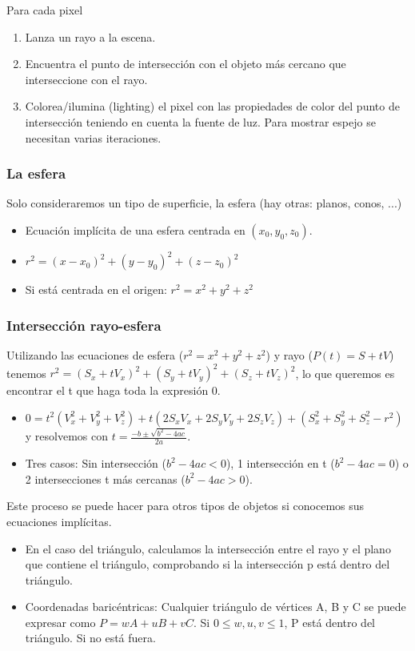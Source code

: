 Para cada pixel
\begin{enumerate}
	\item Lanza un rayo a la escena.
	\item Encuentra el punto de intersección con el objeto más cercano que interseccione con el rayo.
	\item Colorea/ilumina (lighting) el pixel con las propiedades de color del punto de intersección teniendo en cuenta la fuente de luz. Para mostrar espejo se necesitan varias iteraciones.
\end{enumerate}

\subsubsection{La esfera}
Solo consideraremos un tipo de superficie, la esfera (hay otras: planos, conos, ...)
\begin{itemize}
	\item Ecuación implícita de una esfera centrada en $(x_0, y_0, z_0)$.
	\item $r^2=(x-x_0)^2+(y-y_0)^2+(z-z_0)^2$
	\item Si está centrada en el origen: $r^2=x^2+y^2+z^2$
\end{itemize}

\subsubsection{Intersección rayo-esfera}
Utilizando las ecuaciones de esfera ($r^2=x^2+y^2+z^2$) y rayo ($P(t)=S+tV$) tenemos $r^2=(S_x+tV_x)^2+(S_y+tV_y)^2+(S_z+tV_z)^2$, lo que queremos es encontrar el t que haga toda la expresión 0.
\begin{itemize}
	\item $0=t^2(V_x^2+V_y^2+V_z^2)+t(2S_xV_x+2S_yV_y+2S_zV_z)+(S_x^2+S_y^2+S_z^2-r^2)$ y resolvemos con $t=\frac{-b \pm \sqrt{b^2-4ac}}{2a}$.
	\item Tres casos: Sin intersección ($b^2-4ac <0$), 1 intersección en t ($b^2-4ac =0$) o 2 intersecciones t más cercanas ($b^2-4ac >0$).
\end{itemize}

Este proceso se puede hacer para otros tipos de objetos si conocemos sus ecuaciones implícitas.
\begin{itemize}
	\item En el caso del triángulo, calculamos la intersección entre el rayo y el plano que contiene el triángulo, comprobando si la intersección p está dentro del triángulo.
	\item Coordenadas baricéntricas: Cualquier triángulo de vértices A, B y C se puede expresar como $P=wA+uB+vC$. Si $0\leq w, u, v \leq 1$, P está dentro del triángulo. Si no está fuera.
\end{itemize}

